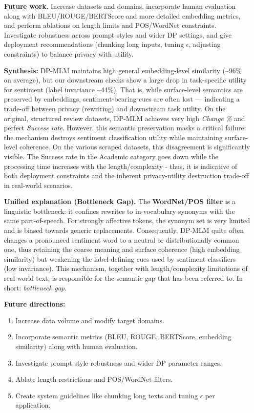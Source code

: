 \documentclass[11pt]{article}
\begin{document}
\textbf{Future work.} Increase datasets and domains, incorporate human evaluation along with BLEU/ROUGE/BERTScore and more detailed embedding metrics, and perform ablations on length limits and POS/WordNet constraints. Investigate robustness across prompt styles and wider DP settings, and give deployment recommendations (chunking long inputs, tuning $\epsilon$, adjusting constraints) to balance privacy with utility.

\textbf{Synthesis:} DP-MLM maintains high general embedding-level similarity (\textasciitilde{}96\% on average), but our downstream checks show a large drop in task-specific utility for sentiment (label invariance \textasciitilde{}44\%). That is, while surface-level semantics are preserved by embeddings, sentiment-bearing cues are often lost — indicating a trade-off between privacy (rewriting) and downstream task utility. On the original, structured review datasets, DP-MLM achieves very high \textit{Change \%} and perfect \textit{Success rate}. However, this semantic preservation masks a critical failure: the mechanism destroys sentiment classification utility while maintaining surface-level coherence. On the various scraped datasets, this disagreement is significantly visible. The Success rate in the Academic category goes down while the processing time increases with the length/complexity - thus, it is indicative of both deployment constraints and the inherent privacy-utility destruction trade-off in real-world scenarios.

\textbf{Unified explanation (Bottleneck \textrightarrow{} Gap).} The \textbf{WordNet/POS filter} is a linguistic bottleneck: it confines rewrites to in-vocabulary synonyms with the same part-of-speech. For strongly affective tokens, the synonym set is very limited and is biased towards generic replacements. Consequently, DP-MLM quite often changes a pronounced sentiment word to a neutral or distributionally common one, thus retaining the coarse meaning and surface coherence (high embedding similarity) but weakening the label-defining cues used by sentiment classifiers (low invariance). This mechanism, together with length/complexity limitations of real-world text, is responsible for the semantic gap that has been referred to. In short: \emph{bottleneck \textrightarrow{} ​‍​‌‍​‍‌gap}.

\textbf{Future directions:}
\begin{enumerate}[leftmargin=*]
  \item Increase data volume and modify target domains.
  \item Incorporate semantic metrics (BLEU, ROUGE, BERTScore, embedding similarity) along with human evaluation.
  \item Investigate prompt style robustness and wider DP parameter ranges.
  \item Ablate length restrictions and POS/WordNet filters.
  \item Create system guidelines like chunking long texts and tuning $\epsilon$ per application.
\end{enumerate}
\end{document}
